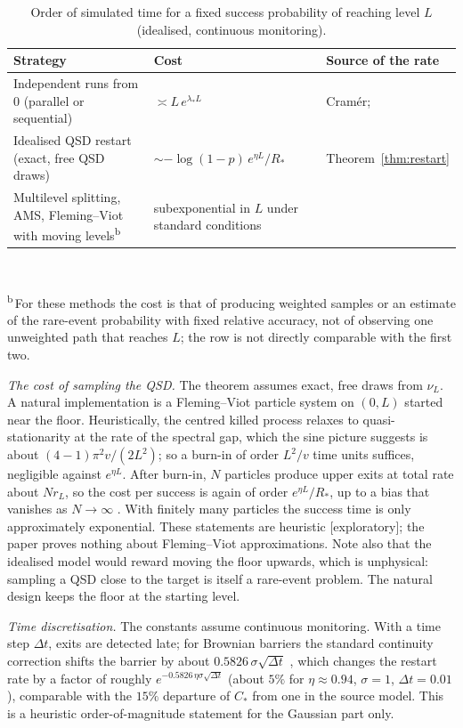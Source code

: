 \documentclass[11pt,a4paper]{article}
\theoremstyle{definition}
\theoremstyle{remark}
\newcommand{\1}{\mathbf 1}
\newcommand{\status}[1]{\textsf{[#1]}}
\begin{document}
\begin{table}[h]
\centering\small
\caption{Order of simulated time for a fixed success probability of reaching level $L$ (idealised, continuous monitoring).}\label{tab:cost}
\begin{tabularx}{\textwidth}{@{}p{}Xl@{}}
\toprule
Strategy & Cost & Source of the rate\\
\midrule
Independent runs from $0$ (parallel or sequential) & $\asymp L\,e^{\lambda_*L}$ & Cram\'er; \cite{garcia,bertoindoney}\\
Idealised QSD restart (exact, free QSD draws) & $\sim-\log(1-p)\,e^{\eta L}/R_*$ & Theorem~\ref{thm:restart}\\
Multilevel splitting, AMS, Fleming--Viot with moving levels\textsuperscript{b} & subexponential in $L$ under standard conditions & \cite{ghsz,cerougu,cdgr}\\
\bottomrule
\end{tabularx}\\[2pt]
\raggedright\footnotesize\textsuperscript{b}\,For these methods the cost is that of producing weighted samples or an estimate of the rare-event probability with fixed relative accuracy, not of observing one unweighted path that reaches $L$; the row is not directly comparable with the first two.
\end{table}

\emph{The cost of sampling the QSD.} The theorem assumes exact, free draws from $\nu_L$. A natural implementation is a Fleming--Viot particle system \cite{bhm,ferrarimaric,villemonais14,afg} on $(0,L)$ started near the floor. Heuristically, the centred killed process relaxes to quasi-stationarity at the rate of the spectral gap, which the sine picture suggests is about $(4-1)\pi^2v/(2L^2)$; so a burn-in of order $L^2/v$ time units suffices, negligible against $e^{\eta L}$. After burn-in, $N$ particles produce upper exits at total rate about $Nr_L$, so the cost per success is again of order $e^{\eta L}/R_*$, up to a bias that vanishes as $N\to\infty$ \cite{villemonais14,cdgrfv}. With finitely many particles the success time is only approximately exponential. These statements are heuristic \status{exploratory}; the paper proves nothing about Fleming--Viot approximations. Note also that the idealised model would reward moving the floor upwards, which is unphysical: sampling a QSD close to the target is itself a rare-event problem. The natural design keeps the floor at the starting level.

\emph{Time discretisation.} The constants assume continuous monitoring. With a time step $\Delta t$, exits are detected late; for Brownian barriers the standard continuity correction shifts the barrier by about $0.5826\,\sigma\sqrt{\Delta t}$ \cite{bgk}, which changes the restart rate by a factor of roughly $e^{-0.5826\,\eta\sigma\sqrt{\Delta t}}$ (about $5\%$ for $\eta\approx0.94$, $\sigma=1$, $\Delta t=0.01$), comparable with the $15\%$ departure of $C_*$ from one in the source model. This is a heuristic order-of-magnitude statement for the Gaussian part only.
\end{document}
